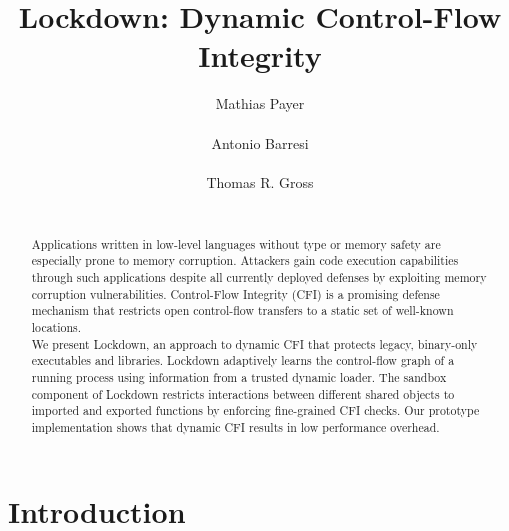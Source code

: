 \documentclass{acm_proc_article-sp}
\begin{document}
\title{Lockdown: Dynamic Control-Flow Integrity}



 \author{
\alignauthor
Mathias Payer\\
       \\
\alignauthor
Antonio Barresi\\
       \\
\alignauthor
Thomas R. Gross\\
       \\
}

\maketitle
\begin{abstract}
Applications written in low-level languages without type or memory safety
are especially prone to memory corruption. Attackers gain code execution
capabilities through such applications despite all currently deployed defenses
by exploiting memory corruption vulnerabilities. Control-Flow Integrity (CFI) is
a promising defense mechanism that restricts open control-flow transfers to a
static set of well-known locations.\\
We present Lockdown, an approach to dynamic CFI that protects legacy,
binary-only executables and libraries. Lockdown adaptively learns the control-flow
graph of a running process using information from a trusted dynamic loader.  The
sandbox component of Lockdown restricts interactions between different
shared objects to imported and exported functions by enforcing fine-grained
CFI checks. Our prototype implementation shows that dynamic CFI results in low
performance overhead. 

\end{abstract}







\section{Introduction}


\let\thefootnote\relax{}
\end{document}
